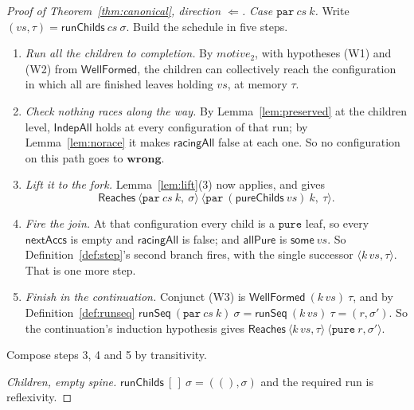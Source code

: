 \documentclass[11pt,a4paper]{article}
\theoremstyle{definition}
\theoremstyle{plain}
\theoremstyle{remark}
\newcommand{\st}{\sigma}
\newcommand{\runSeq}{\mathsf{runSeq}}
\newcommand{\wf}{\mathsf{WellFormed}}
\newcommand{\Reaches}{\mathsf{Reaches}}
\newcommand{\wrong}{\mathbf{wrong}}
\begin{document}
\begin{proof}[Proof of Theorem~\ref{thm:canonical}, direction $\Longleftarrow$]
\emph{Case $\texttt{par}\ cs\ k$.} Write $(vs,\tau) = \mathsf{runChilds}\ cs\ \st$. Build the
schedule in five steps.
\begin{enumerate}[label=\arabic*.,leftmargin=2em,itemsep=1pt]
\item \emph{Run all the children to completion.} By $\mathit{motive}_2$, with hypotheses (W1)
      and (W2) from $\wf$, the children can collectively reach the configuration in which all
      are finished leaves holding $vs$, at memory $\tau$.
\item \emph{Check nothing races along the way.} By Lemma~\ref{lem:preserved} at the children
      level, $\mathsf{IndepAll}$ holds at every configuration of that run; by
      Lemma~\ref{lem:norace} it makes $\mathsf{racingAll}$ false at each one. So no
      configuration on this path goes to $\wrong$.
\item \emph{Lift it to the fork.} Lemma~\ref{lem:lift}(3) now applies, and gives
      \[
        \Reaches\ \langle \texttt{par}\ cs\ k,\ \st\rangle\
                  \langle \texttt{par}\ (\mathsf{pureChilds}\ vs)\ k,\ \tau\rangle .
      \]
\item \emph{Fire the join.} At that configuration every child is a $\texttt{pure}$ leaf, so
      every $\mathsf{nextAccs}$ is empty and $\mathsf{racingAll}$ is false; and
      $\mathsf{allPure}$ is $\mathsf{some}\ vs$. So Definition~\ref{def:step}'s second branch
      fires, with the single successor $\langle k\,vs, \tau\rangle$. That is one more step.
\item \emph{Finish in the continuation.} Conjunct (W3) is $\wf\ (k\,vs)\ \tau$, and by
      Definition~\ref{def:runseq}
      $\runSeq\ (\texttt{par}\ cs\ k)\ \st = \runSeq\ (k\,vs)\ \tau = (r,\st')$. So the
      continuation's induction hypothesis gives
      $\Reaches\ \langle k\,vs, \tau\rangle\ \langle \texttt{pure}\ r, \st'\rangle$.
\end{enumerate}
Compose steps 3, 4 and 5 by transitivity.

\emph{Children, empty spine.} $\mathsf{runChilds}\ [\,]\ \st = ((),\st)$ and the required run
is reflexivity.


\end{proof}
\end{document}
